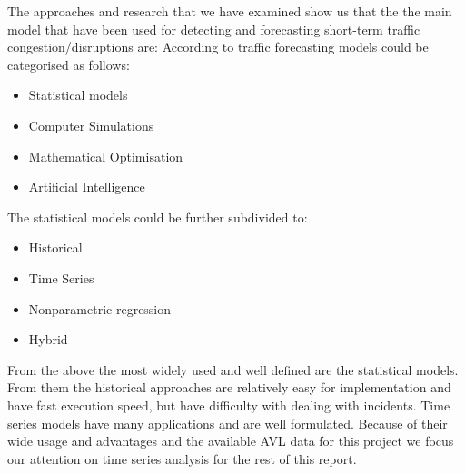 
The approaches and research that we have examined show us that the the main model that have been used for detecting and forecasting short-term traffic congestion/disruptions are:
According to \cite{youKim} traffic forecasting models could be categorised as follows:
\begin{itemize}
	\item Statistical models
	\item Computer Simulations
	\item Mathematical Optimisation
	\item Artificial Intelligence
\end{itemize}
The statistical models could be further subdivided to:
\begin{itemize}
	\item Historical
	\item Time Series
	\item Nonparametric regression
	\item Hybrid
\end{itemize}
From the above the most widely used and well defined are the statistical models. From them the historical approaches are relatively easy for implementation and have fast execution speed, but have difficulty with dealing with incidents. Time series models have many applications and are well formulated. Because of their wide usage and advantages and the available AVL data for this project
we focus our attention on time series analysis for the rest of this report.

